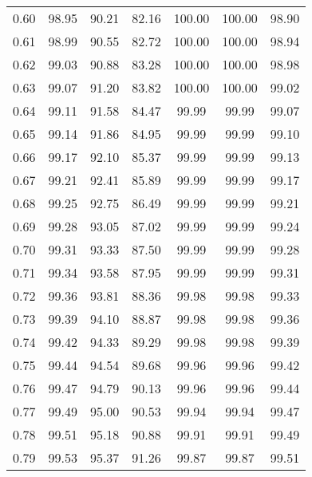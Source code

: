 \begin{tabular}{|c|c|c|c|c|c|c|}
      0.60 &     98.95 &     90.21 &      82.16 &  100.00 &     100.00 &         98.90 \\
      0.61 &     98.99 &     90.55 &      82.72 &  100.00 &     100.00 &         98.94 \\
      0.62 &     99.03 &     90.88 &      83.28 &  100.00 &     100.00 &         98.98 \\
      0.63 &     99.07 &     91.20 &      83.82 &  100.00 &     100.00 &         99.02 \\
      0.64 &     99.11 &     91.58 &      84.47 &   99.99 &      99.99 &         99.07 \\
      0.65 &     99.14 &     91.86 &      84.95 &   99.99 &      99.99 &         99.10 \\
      0.66 &     99.17 &     92.10 &      85.37 &   99.99 &      99.99 &         99.13 \\
      0.67 &     99.21 &     92.41 &      85.89 &   99.99 &      99.99 &         99.17 \\
      0.68 &     99.25 &     92.75 &      86.49 &   99.99 &      99.99 &         99.21 \\
      0.69 &     99.28 &     93.05 &      87.02 &   99.99 &      99.99 &         99.24 \\
      0.70 &     99.31 &     93.33 &      87.50 &   99.99 &      99.99 &         99.28 \\
      0.71 &     99.34 &     93.58 &      87.95 &   99.99 &      99.99 &         99.31 \\
      0.72 &     99.36 &     93.81 &      88.36 &   99.98 &      99.98 &         99.33 \\
      0.73 &     99.39 &     94.10 &      88.87 &   99.98 &      99.98 &         99.36 \\
      0.74 &     99.42 &     94.33 &      89.29 &   99.98 &      99.98 &         99.39 \\
      0.75 &     99.44 &     94.54 &      89.68 &   99.96 &      99.96 &         99.42 \\
      0.76 &     99.47 &     94.79 &      90.13 &   99.96 &      99.96 &         99.44 \\
      0.77 &     99.49 &     95.00 &      90.53 &   99.94 &      99.94 &         99.47 \\
      0.78 &     99.51 &     95.18 &      90.88 &   99.91 &      99.91 &         99.49 \\
      0.79 &     99.53 &     95.37 &      91.26 &   99.87 &      99.87 &         99.51 \\

\end{tabular}
